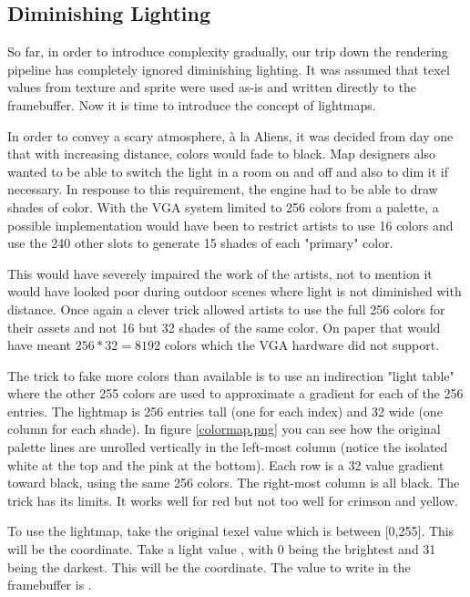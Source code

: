 \subsection{Diminishing Lighting}
\label{diminishedlightning}
\begin{figure}
\centering
{}
\end{figure}
So far, in order to introduce complexity gradually, our trip down the rendering pipeline has completely ignored diminishing lighting. It was assumed that texel values from texture and sprite were used as-is and written directly to the framebuffer. Now it is time to introduce the concept of lightmaps.\\
\par
In order to convey a scary atmosphere, \`a la Aliens, it was decided from day one that with increasing distance, colors would fade to black. Map designers also wanted to be able to switch the light in a room on and off and also to dim it if necessary. In response to this requirement, the engine had to be able to draw shades of color. With the VGA system limited to 256 colors from a palette, a possible implementation would have been to restrict artists to use 16 colors and use the 240 other slots to generate 15 shades of each "primary" color.\\
\par
This would have severely impaired the work of the artists, not to mention it would have looked poor during outdoor scenes where light is not diminished with distance. Once again a clever trick allowed artists to use the full 256 colors for their assets and not 16 but 32 shades of the same color. On paper that would have meant $256 * 32 = 8192$ colors which the VGA hardware did not support.\\
\par
 The trick to fake more colors than available is to use an indirection "light table" where the other 255 colors are used to approximate a gradient for each of the 256 entries. The lightmap is 256 entries tall (one for each index) and 32 wide (one column for each shade). In figure \ref{colormap.png} you can see how the original palette lines are unrolled vertically in the left-most column (notice the isolated white at the top and the pink at the bottom). Each row is a 32 value gradient toward black, using the same 256 colors. The right-most column is all black. The trick has its limits. It works well for red but not too well for crimson and yellow.\\
 \par
 To use the lightmap, take the original texel value  which is between [0,255]. This will be the  coordinate. Take a light value , with 0 being the brightest and 31 being the darkest. This will be the  coordinate. The value to write in the framebuffer is .\\
 \par
{}





